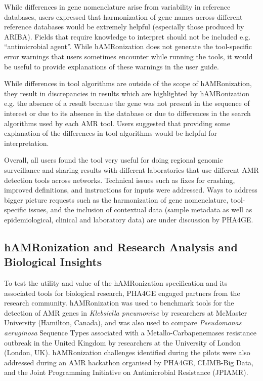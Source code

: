 While differences in gene nomenclature arise from variability in reference databases, users expressed that harmonization of gene names across different reference databases would be extremely helpful (especially those produced by ARIBA). Fields that require knowledge to interpret should not be included e.g. “antimicrobial agent”. While hAMRonization does not generate the tool-specific error warnings that users sometimes encounter while running the tools, it would be useful to provide explanations of these warnings in the user guide. 

While differences in tool algorithms are outside of the scope of hAMRonization, they result in discrepancies in results which are highlighted by hAMRonization e.g. the absence of a result because the gene was not present in the sequence of interest or due to its absence in the database or due to differences in the search algorithms used by each AMR tool. Users suggested that providing some explanation of the differences in tool algorithms would be helpful for interpretation.

Overall, all users found the tool very useful for doing regional genomic surveillance and sharing results with different laboratories that use different AMR detection tools across networks. Technical issues such as fixes for crashing, improved definitions, and instructions for inputs were addressed. Ways to address bigger picture requests such as the harmonization of gene nomenclature, tool-specific issues, and the inclusion of contextual data (sample metadata as well as epidemiological, clinical and laboratory data) are under discussion by PHA4GE.

\subsection{hAMRonization and Research Analysis and Biological Insights}

To test the utility and value of the hAMRonization specification and its associated tools for biological research, PHA4GE engaged partners from the research community. hAMRonization was used to benchmark tools for the detection of AMR genes in \textit{Klebsiella pneumoniae} by researchers at McMaster University (Hamilton, Canada), and was also used to compare \textit{Pseudomonas aeruginosa} Sequence Types associated with a Metallo-Carbapenemases resistance outbreak in the United Kingdom by researchers at the University of London (London, UK). hAMRonization challenges identified during the pilots were also addressed during an AMR hackathon organised by PHA4GE, CLIMB-Big Data, and the Joint Programming Initiative on Antimicrobial Resistance (JPIAMR).

